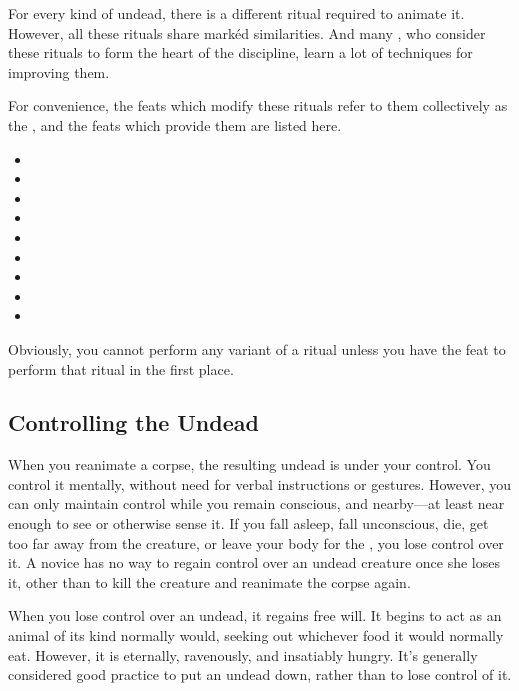 For every kind of undead, there is a different ritual required to animate it.
However, all these rituals share mark{\'e}d similarities.
And many , who consider these rituals to form the heart of the discipline, learn a lot of techniques for improving them.

For convenience, the feats which modify these rituals refer to them collectively as the {\reanimationrituals}, and the feats which provide them are listed here.
\begin{itemize}
	\item {}
	\item {}
	\item {}
	\item {}
	\item {}
	\item {}
	\item {}
	\item {}
	\item {}
\end{itemize}
Obviously, you cannot perform any variant of a ritual unless you have the feat to perform that ritual in the first place.

\subsection{Controlling the Undead}

When you reanimate a corpse, the resulting undead is under your control.
You control it mentally, without need for verbal instructions or gestures.
However, you can only maintain control while you remain conscious, and nearby---at least near enough to see or otherwise sense it.
If you fall asleep, fall unconscious, die, get too far away from the creature, or leave your body for the {\mentalrealm}, you lose control over it.
A novice  has no way to regain control over an undead creature once she loses it, other than to kill the creature and reanimate the corpse again.

When you lose control over an undead, it regains free will.
It begins to act as an animal of its kind normally would, seeking out whichever food it would normally eat.
However, it is eternally, ravenously, and insatiably hungry.
It's generally considered good practice to put an undead down, rather than to lose control of it.

